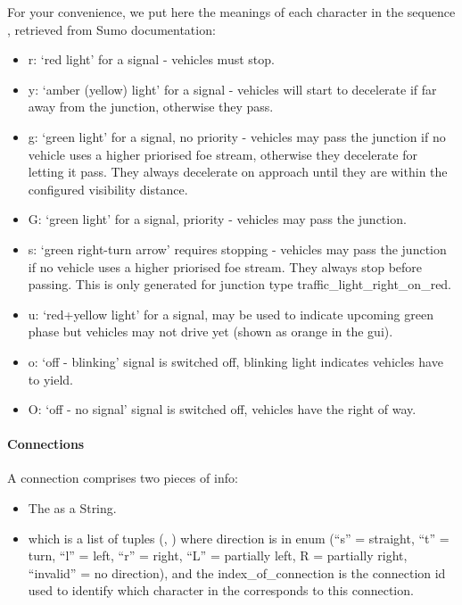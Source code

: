 \documentclass[letterpaper,10pt,english]{sphinxmanual}
\begin{document}
For your convenience, we put here the meanings of each character in the sequence , retrieved from Sumo documentation:
\begin{itemize}
\item {} 
r: ‘red light’ for a signal - vehicles must stop.

\item {} 
y: ‘amber (yellow) light’ for a signal - vehicles will start to decelerate if far away from the junction, otherwise they pass.

\item {} 
g: ‘green light’ for a signal, no priority - vehicles may pass the junction if no vehicle uses a higher priorised foe stream, otherwise they decelerate for letting it pass.
They always decelerate on approach until they are within the configured visibility distance.

\item {} 
G: ‘green light’ for a signal, priority - vehicles may pass the junction.

\item {} 
s: ‘green right-turn arrow’ requires stopping - vehicles may pass the junction if no vehicle uses a higher priorised foe stream.
They always stop before passing. This is only generated for junction type traffic\_light\_right\_on\_red.

\item {} 
u: ‘red+yellow light’ for a signal, may be used to indicate upcoming green phase but vehicles may not drive yet (shown as orange in the gui).

\item {} 
o: ‘off - blinking’ signal is switched off, blinking light indicates vehicles have to yield.

\item {} 
O: ‘off - no signal’ signal is switched off, vehicles have the right of way.

\end{itemize}


\paragraph{Connections}
\label{\detokenize{microservices/contract_maker/input:connections}}
A connection comprises two pieces of info:
\begin{itemize}
\item {} 
The  as a String.

\item {} 
 which is a list of tuples (, ) where direction is in enum (“s” = straight, “t” = turn, “l” = left, “r” = right, “L” = partially left, R = partially right, “invalid” = no direction), and the index\_of\_connection is the connection id used to identify which character in the  corresponds to this connection.

\end{itemize}
\end{document}
